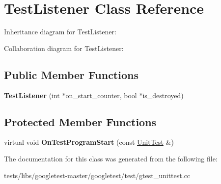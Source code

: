 \hypertarget{classTestListener}{}\section{Test\+Listener Class Reference}
\label{classTestListener}


Inheritance diagram for Test\+Listener\+:


Collaboration diagram for Test\+Listener\+:
\subsection*{Public Member Functions}
\begin{DoxyCompactItemize}
\item 
\mbox{\label{classTestListener_ab65604c6c3742c494e9378e770da5d42}} 
{\bfseries Test\+Listener} (int $\ast$on\+\_\+start\+\_\+counter, bool $\ast$is\+\_\+destroyed)
\end{DoxyCompactItemize}
\subsection*{Protected Member Functions}
\begin{DoxyCompactItemize}
\item 
\mbox{\label{classTestListener_a6218f522f5b6b37050ff0ea630ac5fd3}} 
virtual void {\bfseries On\+Test\+Program\+Start} (const \hyperlink{classtesting_1_1UnitTest}{Unit\+Test} \&)
\end{DoxyCompactItemize}


The documentation for this class was generated from the following file\+:\begin{DoxyCompactItemize}
\item 
tests/libs/googletest-\/master/googletest/test/gtest\+\_\+unittest.\+cc\end{DoxyCompactItemize}

